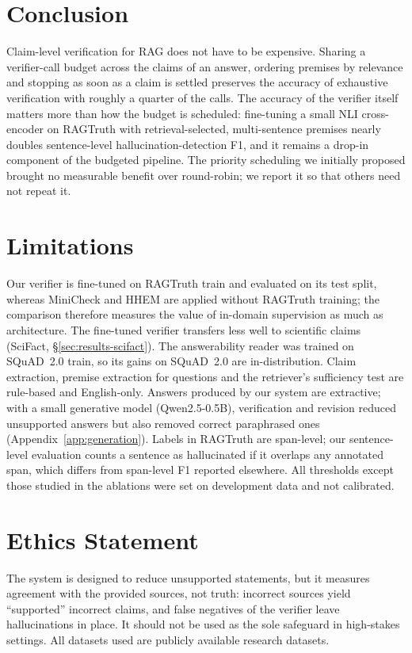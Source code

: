 \section{Conclusion}
\label{sec:conclusion}
Claim-level verification for RAG does not have to be expensive.
Sharing a verifier-call budget across the claims of an answer, ordering premises by relevance and stopping as soon as a claim is settled preserves the accuracy of exhaustive verification with roughly a quarter of the calls.
The accuracy of the verifier itself matters more than how the budget is scheduled: fine-tuning a small NLI cross-encoder on RAGTruth with retrieval-selected, multi-sentence premises nearly doubles sentence-level hallucination-detection F1, and it remains a drop-in component of the budgeted pipeline.
The priority scheduling we initially proposed brought no measurable benefit over round-robin; we report it so that others need not repeat it.

\section*{Limitations}
Our verifier is fine-tuned on RAGTruth train and evaluated on its test split, whereas MiniCheck and HHEM are applied without RAGTruth training; the comparison therefore measures the value of in-domain supervision as much as architecture. The fine-tuned verifier transfers less well to scientific claims (SciFact, \S\ref{sec:results-scifact}).
The answerability reader was trained on SQuAD~2.0 train, so its gains on SQuAD~2.0 are in-distribution.
Claim extraction, premise extraction for questions and the retriever's sufficiency test are rule-based and English-only.
Answers produced by our system are extractive; with a small generative model (Qwen2.5-0.5B), verification and revision reduced unsupported answers but also removed correct paraphrased ones (Appendix~\ref{app:generation}).
Labels in RAGTruth are span-level; our sentence-level evaluation counts a sentence as hallucinated if it overlaps any annotated span, which differs from span-level F1 reported elsewhere.
All thresholds except those studied in the ablations were set on development data and not calibrated.

\section*{Ethics Statement}
The system is designed to reduce unsupported statements, but it measures agreement with the provided sources, not truth: incorrect sources yield ``supported'' incorrect claims, and false negatives of the verifier leave hallucinations in place. It should not be used as the sole safeguard in high-stakes settings. All datasets used are publicly available research datasets.
